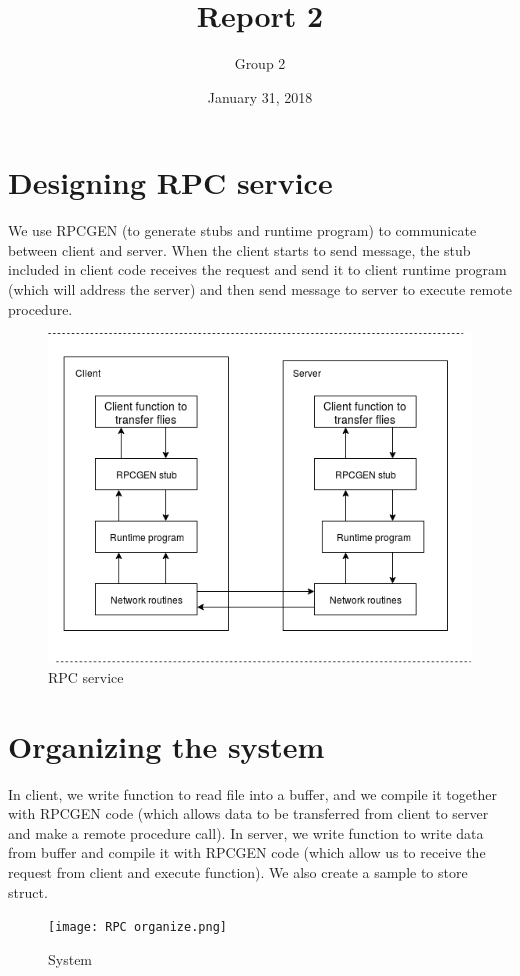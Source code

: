 \documentclass[12pt]{article}
\title{Report 2}
\author{Group 2}
\date{January 31, 2018}
\begin{document}
\maketitle
  \section{Designing RPC service}
    We use RPCGEN (to generate stubs and runtime program) to communicate between client and server. When the client starts to send message, the stub included in client code receives the request and send it to client runtime program (which will address the server) and then send message to server to execute remote procedure.

    \begin{figure}[h]
        \centering
       \includegraphics[scale=0.4]{RPC Service.png}
       \caption{RPC service}
    \end{figure}
  
  \section{Organizing the system}
   In client, we write function to read file into a buffer, and we compile it together with RPCGEN code (which allows data to be transferred from client to server and make a remote procedure call). In server, we write function to write data from buffer and compile it with RPCGEN code (which allow us to receive the request from client and execute function). We also create a sample to store struct.
    \begin{figure}[h]
        \centering
       \texttt{[image: RPC organize.png]}
        \caption{System}
    \end{figure}
\end{document}

